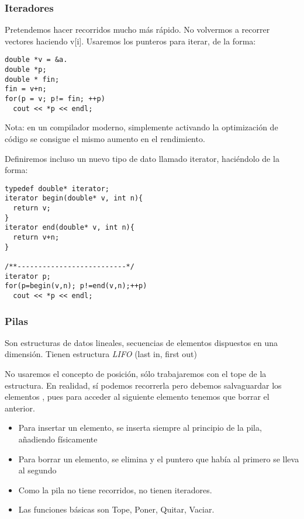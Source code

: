 \documentclass[11pt]{article}
\begin{document}
\subsubsection{Iteradores}
\label{sec-1-1-3}

Pretendemos hacer recorridos mucho más rápido. No volvermos a recorrer vectores haciendo v[i]. Usaremos los punteros para iterar, de la forma:


\begin{verbatim}
double *v = &a.
double *p;
double * fin;
fin = v+n;
for(p = v; p!= fin; ++p)
  cout << *p << endl;
\end{verbatim}

Nota: en un compilador moderno, simplemente activando la optimización de código se consigue el mismo aumento en el rendimiento.

Definiremos incluso un nuevo tipo de dato llamado iterator, haciéndolo de la forma:

\begin{verbatim}
typedef double* iterator;
iterator begin(double* v, int n){
  return v;
}
iterator end(double* v, int n){
  return v+n;
}

/**--------------------------*/
iterator p;
for(p=begin(v,n); p!=end(v,n);++p)
  cout << *p << endl;
\end{verbatim}

\subsubsection{Pilas}
\label{sec-1-1-4}
Son estructuras de datos lineales, secuencias de elementos dispuestos en una dimensión. Tienen estructura \emph{LIFO} (last in, first out)

No usaremos el concepto de posición, sólo trabajaremos con el tope de la estructura. En realidad, sí podemos recorrerla pero debemos salvaguardar los elementos
, pues para acceder al siguiente elemento tenemos que borrar el anterior.

\begin{itemize}
\item Para insertar un elemento, se inserta siempre al principio de la pila, añadiendo físicamente
\item Para borrar un elemento, se elimina y el puntero que había al primero se lleva al segundo
\item Como la pila no tiene recorridos, no tienen iteradores.
\item Las funciones básicas son Tope, Poner, Quitar, Vaciar.
\end{itemize}
\end{document}
